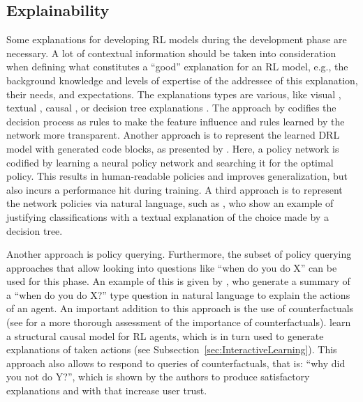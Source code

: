\documentclass[twoside,11pt]{article}
\begin{document}
\begin{enumerate}
\subsection{Explainability}
Some explanations for developing RL models during the development phase are necessary. A lot of contextual information should be taken into consideration when defining what constitutes a ``good” explanation for an RL model, e.g., the background knowledge and levels of expertise of the addressee of this explanation, their needs, and expectations. The explanations types are various, like visual \citep{DBLP:journals/corr/abs-1912-12191,DBLP:journals/corr/abs-1912-05743}, textual \citep{fukuchi2017autonomous,HayesShah:2017:AutonomousPolicyExplanation}, causal \citep{MadumalEtAl:2020:CausalRLCFs,Madumal:2020:DistalEF}, or decision tree explanations \citep{bastani2018verifiable}. The approach by \citet{LiuEtAl:2018:LinearModelUTrees} codifies the decision process as rules to make the feature influence and rules learned by the network more transparent. Another approach is to represent the learned DRL model with generated code blocks, as presented by \citet{VermaEtAl:2018:ProgrammaticallyInterpretableRL}. Here, a policy network is codified by learning a neural policy network and searching it for the optimal policy. This results in human-readable policies and improves generalization, but also incurs a performance hit during training. A third approach is to represent the network policies via natural language, such as \citet{AlonsoEtAl:2018:xAINLBeerClassifier}, who show an example of justifying classifications with a textual explanation of the choice made by a decision tree.

Another approach is policy querying.
Furthermore, the subset of policy querying approaches that allow looking into questions like ``when do you do X'' can be used for this phase.
An example of this is given by \citet{HayesShah:2017:AutonomousPolicyExplanation}, who generate a summary of a ``when do you do X?'' type question in natural language to explain the actions of an agent. An important addition to this approach is the use of counterfactuals (see \citet{EvansEtAl:2021:ExplainabilityParadox} for a more thorough assessment of the importance of counterfactuals). \citet{MadumalEtAl:2020:CausalRLCFs} learn a structural causal model for RL agents, which is in turn used to generate explanations of taken actions (see Subsection~\ref{sec:InteractiveLearning}). This approach also allows to respond to queries of counterfactuals, that is: ``why did you not do Y?'', which is shown by the authors to produce satisfactory explanations and with that increase user trust.


\end{enumerate}
\end{document}
